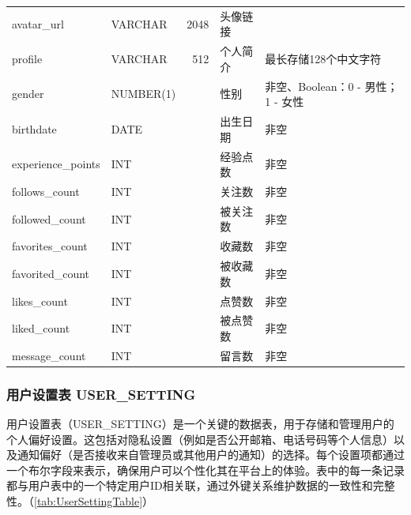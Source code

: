 \begin{longtable}[c]{@{}llrll@{}}
    avatar\_url        & VARCHAR       & 2048        & 头像链接        &                            \\
    profile            & VARCHAR       & 512         & 个人简介        & 最长存储128个中文字符               \\
    gender             & NUMBER(1)     &             & 性别          & 非空、Boolean：0 - 男性；1 - 女性   \\
    birthdate          & DATE          &             & 出生日期        & 非空                         \\
    experience\_points & INT           &             & 经验点数        & 非空                         \\
    follows\_count     & INT           &             & 关注数         & 非空                         \\
    followed\_count    & INT           &             & 被关注数        & 非空                         \\
    favorites\_count   & INT           &             & 收藏数         & 非空                         \\
    favorited\_count   & INT           &             & 被收藏数        & 非空                         \\
    likes\_count       & INT           &             & 点赞数         & 非空                         \\
    liked\_count       & INT           &             & 被点赞数        & 非空                         \\
    message\_count     & INT           &             & 留言数         & 非空                         \\ \bottomrule
\end{longtable}

\subsubsection{用户设置表 USER\_SETTING}

用户设置表（USER\_SETTING）是一个关键的数据表，用于存储和管理用户的个人偏好设置。这包括对隐私设置（例如是否公开邮箱、电话号码等个人信息）以及通知偏好（是否接收来自管理员或其他用户的通知）的选择。每个设置项都通过一个布尔字段来表示，确保用户可以个性化其在平台上的体验。表中的每一条记录都与用户表中的一个特定用户ID相关联，通过外键关系维护数据的一致性和完整性。（\cref{tab:UserSettingTable}）

